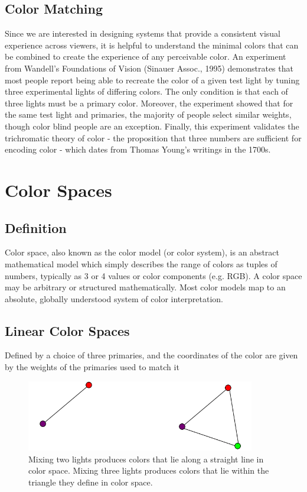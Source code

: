 \documentclass{article}
\begin{document}
\subsection{Color Matching}
Since we are interested in designing systems that provide a consistent visual experience across viewers, it is helpful to understand the minimal colors that can be combined to create the experience of any perceivable color. An experiment from Wandell's Foundations of Vision (Sinauer Assoc., 1995) demonstrates that most people report being able to recreate the color of a given test light by tuning three experimental lights of differing colors. The only condition is that each of three lights must be a primary color. Moreover, the experiment showed that for the same test light and primaries,	the majority of people select similar weights, though color blind people are an exception. Finally, this experiment validates the trichromatic theory of color - the proposition that three	numbers	are	sufficient	for	encoding color -  which dates from Thomas Young's writings in the 1700s.


\section{Color Spaces}
\subsection{Definition} 
Color space, also known as the color model (or color system), is an abstract mathematical model which simply describes the range of colors as tuples of numbers, typically as 3 or 4 values or color components (e.g. RGB). A color space may be arbitrary or structured mathematically. Most color models map to an absolute, globally understood system of color interpretation. 

\subsection{Linear Color Spaces}
	Defined by a choice of three primaries, and the coordinates of the color are given by the weights of the primaries used to match it
    
    \begin{figure}[h!]
    \centering
    \includegraphics[width=10cm]{color1.png}
    \caption{Mixing two lights produces colors that lie along a straight line in color space. Mixing three lights produces colors that lie within the triangle they define in color space.}
    \end{figure}
    
\end{document}
